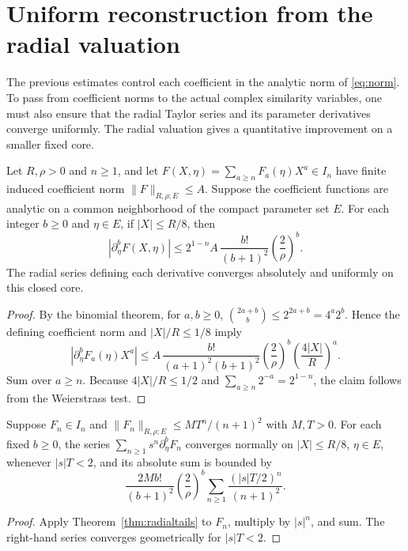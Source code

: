 
\section{Uniform reconstruction from the radial valuation}
\label{sec:reconstruction}
The previous estimates control each coefficient in the analytic norm of
\eqref{eq:norm}. To pass from coefficient norms to the actual complex
similarity variables, one must also ensure that the radial Taylor series and
its parameter derivatives converge uniformly. The radial valuation gives a
quantitative improvement on a smaller fixed core.

\begin{theorem}
\label{thm:radialtails}
Let $R,\rho>0$ and $n\ge1$, and let
$F(X,\eta)=\sum_{a\ge n}F_a(\eta)X^a\in I_n$ have finite induced
coefficient norm $\|F\|_{R,\rho;E}\le A$. Suppose the coefficient functions
are analytic on a common neighborhood of the compact parameter set $E$.
For each integer $b\ge0$ and $\eta\in E$, if $|X|\le R/8$, then
\begin{equation}\label{eq:tailreconstruct}
 |\partial_\eta^b F(X,\eta)|\le
 2^{1-n}A\,\frac{b!}{(b+1)^2}\left(\frac2\rho\right)^b.
\end{equation}
The radial series defining each derivative converges absolutely
and uniformly on this closed core.
\end{theorem}
\begin{proof}
By the binomial theorem, for $a,b\ge0$,
$\binom{2a+b}{b}\le 2^{2a+b}=4^a2^b$. Hence the defining
coefficient norm and $|X|/R\le1/8$ imply
\[
 |\partial_\eta^b F_a(\eta)X^a|
 \le A\,\frac{b!}{(a+1)^2(b+1)^2}
 \left(\frac2\rho\right)^b
 \left(\frac{4|X|}{R}\right)^a.
\]
Sum over $a\ge n$. Because $4|X|/R\le1/2$ and
$\sum_{a\ge n}2^{-a}=2^{1-n}$, the claim follows from
the Weierstrass test.
\end{proof}

\begin{corollary}
\label{cor:reconstruct}
Suppose $F_n\in I_n$ and
$\|F_n\|_{R,\rho;E}\le MT^n/(n+1)^2$ with $M,T>0$.
For each fixed $b\ge0$, the series
$\sum_{n\ge1}s^n\partial_\eta^b F_n$ converges normally
on $|X|\le R/8$, $\eta\in E$, whenever $|s|T<2$, and its
absolute sum is bounded by
\begin{equation}\label{eq:reconstructmaj}
 \frac{2Mb!}{(b+1)^2}\left(\frac2\rho\right)^b
 \sum_{n\ge1}\frac{(|s|T/2)^n}{(n+1)^2}.
\end{equation}
\end{corollary}
\begin{proof}
Apply Theorem~\ref{thm:radialtails} to $F_n$, multiply by
$|s|^n$, and sum. The right-hand series converges geometrically
for $|s|T<2$.
\end{proof}

